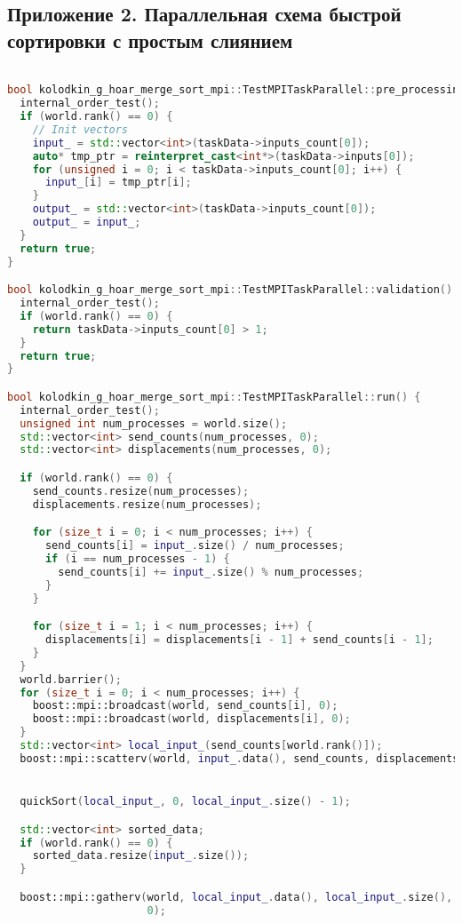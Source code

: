 \documentclass{report}
\begin{document}
\subsection*{Приложение 2. Параллельная схема быстрой сортировки с простым слиянием}
\begin{lstlisting}[language=C++,caption={Приложение 2.}]

bool kolodkin_g_hoar_merge_sort_mpi::TestMPITaskParallel::pre_processing() {
  internal_order_test();
  if (world.rank() == 0) {
    // Init vectors
    input_ = std::vector<int>(taskData->inputs_count[0]);
    auto* tmp_ptr = reinterpret_cast<int*>(taskData->inputs[0]);
    for (unsigned i = 0; i < taskData->inputs_count[0]; i++) {
      input_[i] = tmp_ptr[i];
    }
    output_ = std::vector<int>(taskData->inputs_count[0]);
    output_ = input_;
  }
  return true;
}

bool kolodkin_g_hoar_merge_sort_mpi::TestMPITaskParallel::validation() {
  internal_order_test();
  if (world.rank() == 0) {
    return taskData->inputs_count[0] > 1;
  }
  return true;
}

bool kolodkin_g_hoar_merge_sort_mpi::TestMPITaskParallel::run() {
  internal_order_test();
  unsigned int num_processes = world.size();
  std::vector<int> send_counts(num_processes, 0);
  std::vector<int> displacements(num_processes, 0);

  if (world.rank() == 0) {
    send_counts.resize(num_processes);
    displacements.resize(num_processes);

    for (size_t i = 0; i < num_processes; i++) {
      send_counts[i] = input_.size() / num_processes;
      if (i == num_processes - 1) {
        send_counts[i] += input_.size() % num_processes;
      }
    }

    for (size_t i = 1; i < num_processes; i++) {
      displacements[i] = displacements[i - 1] + send_counts[i - 1];
    }
  }
  world.barrier();
  for (size_t i = 0; i < num_processes; i++) {
    boost::mpi::broadcast(world, send_counts[i], 0);
    boost::mpi::broadcast(world, displacements[i], 0);
  }
  std::vector<int> local_input_(send_counts[world.rank()]);
  boost::mpi::scatterv(world, input_.data(), send_counts, displacements, local_input_.data(), local_input_.size(), 0);


  quickSort(local_input_, 0, local_input_.size() - 1);

  std::vector<int> sorted_data;
  if (world.rank() == 0) {
    sorted_data.resize(input_.size());
  }

  boost::mpi::gatherv(world, local_input_.data(), local_input_.size(), sorted_data.data(), send_counts, displacements,
                      0);


\end{lstlisting}
\end{document}
